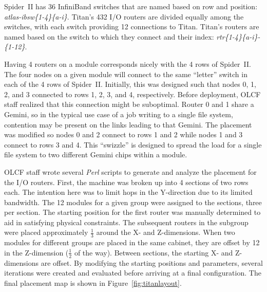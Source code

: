 Spider~II has 36 InfiniBand switches that are named based on row and position:
\textit{atlas-ibsw\{1-4\}\{a-i\}}.  Titan's 432 I/O routers are divided equally
among the switches, with each switch providing 12 connections to Titan.
Titan's routers are named based on the switch to which they connect and their
index: \textit{rtr\{1-4\}\{a-i\}-\{1-12\}}.

Having 4 routers on a module corresponds nicely with the 4 rows of Spider~II.
The  four nodes on a given module will connect to the same ``letter'' switch in
each of the 4 rows of Spider~II.  Initially, this was designed such that nodes
0, 1, 2, and 3 connected to rows 1, 2, 3, and 4, respectively.  Before
deployment, OLCF staff realized that this connection might be suboptimal.
Router 0 and 1 share a Gemini, so in the typical use case of a job writing to a
single file system, contention may be present on the links leading to that
Gemini.  The placement was modified so nodes 0 and 2 connect to rows 1 and 2
while nodes 1 and 3 connect to rows 3 and 4.  This ``swizzle'' is designed to
spread the load for a single file system to two different Gemini chips within a
module.

OLCF staff wrote several \textit{Perl} scripts to generate and analyze the
placement for the I/O routers.  First, the machine was broken up into 4
sections of two rows each.  The intention here was to limit hops in the
Y-direction due to its limited bandwidth.  The 12 modules for a given group
were assigned to the sections, three per section.  The starting position for
the first router was manually determined to aid in satisfying physical
constraints.  The subsequent routers in the subgroup were placed approximately
$\frac{1}{3}$ around the X- and Z-dimensions.  When two modules for different
groups are placed in the same cabinet, they are offset by 12 in the Z-dimension
($\frac{1}{2}$ of the way).  Between sections, the starting X- and Z-dimensions
are offset.  By modifying the starting positions and parameters, several
iterations were created and evaluated before arriving at a final configuration.
The final placement map is shown in Figure~\ref{fig:titanlayout}.


